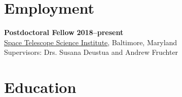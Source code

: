 \documentclass[margin]{res}
\begin{document}
\begin{resume}

\section{Employment} 


{\bf Postdoctoral Fellow} \hfill {\bf 2018--present}\\
\href{http://physics.nd.edu}{Space Telescope Science Institute}, Baltimore, Maryland\\ 
Supervisors: Drs. Susana Deustua and Andrew Fruchter




 




\section{Education}


\end{resume}
\end{document}
